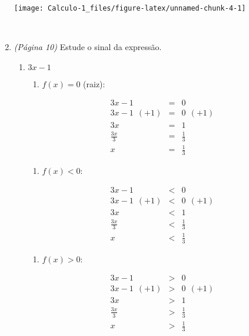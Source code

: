 \documentclass[]{book}
\providecommand{\tightlist}{%
  \setlength{\itemsep}{0pt}\setlength{\parskip}{0pt}}
\begin{document}
\begin{enumerate}
  \begin{center}\texttt{[image: Calculo-1\_files/figure-latex/unnamed-chunk-4-1]} \end{center}

  ~
\item
  \emph{(Página 10)} Estude o sinal da expressão.

  \begin{enumerate}
  \def\labelenumii{\alph{enumii})}
  \item
    \(3x-1\)

    \begin{enumerate}
    \def\labelenumiii{\roman{enumiii})}
    \tightlist
    \item
      \(f(x) = 0\) (raiz):
    \end{enumerate}

    \begin{eqnarray}
    3x-1 &=& 0 \nonumber \\
    3x-1 \ \ (+1) &=& 0 \ \ (+1) \nonumber \\
    3x &=& 1 \nonumber \\
    \frac{3x}{3} &=& \frac{1}{3} \nonumber \\
    x &=& \frac{1}{3} \nonumber
    \end{eqnarray}

    \begin{enumerate}
    \def\labelenumiii{\roman{enumiii})}
    \setcounter{enumiii}{1}
    \tightlist
    \item
      \(f(x) < 0\):
    \end{enumerate}

    \begin{eqnarray}
    3x-1 &<& 0 \nonumber \\
    3x-1 \ \ (+1) &<& 0 \ \ (+1) \nonumber \\
    3x &<& 1 \nonumber \\
    \frac{3x}{3} &<& \frac{1}{3} \nonumber \\
    x &<& \frac{1}{3} \nonumber
    \end{eqnarray}

    \begin{enumerate}
    \def\labelenumiii{\roman{enumiii})}
    \setcounter{enumiii}{2}
    \tightlist
    \item
      \(f(x) > 0\):
    \end{enumerate}

    \begin{eqnarray}
    3x-1 &>& 0 \nonumber \\
    3x-1 \ \ (+1) &>& 0 \ \ (+1) \nonumber \\
    3x &>& 1 \nonumber \\
    \frac{3x}{3} &>& \frac{1}{3} \nonumber \\
    x &>& \frac{1}{3} \nonumber
    \end{eqnarray}
  \end{enumerate}


\end{enumerate}
\end{document}
